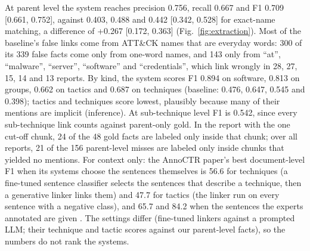 \documentclass[conference,letterpaper]{IEEEtran}
\begin{document}
At parent level the system reaches precision 0.756, recall 0.667 and F1 0.709 [0.661, 0.752], against 0.403, 0.488 and 0.442 [0.342, 0.528] for exact-name matching, a difference of +0.267 [0.172, 0.363] (Fig.~\ref{fig:extraction}). Most of the baseline's false links come from ATT\&CK names that are everyday words: 300 of its 339 false facts come only from one-word names, and 143 only from ``at'', ``malware'', ``server'', ``software'' and ``credentials'', which link wrongly in 28, 27, 15, 14 and 13 reports. By kind, the system scores F1 0.894 on software, 0.813 on groups, 0.662 on tactics and 0.687 on techniques (baseline: 0.476, 0.647, 0.545 and 0.398); tactics and techniques score lowest, plausibly because many of their mentions are implicit (inference). At sub-technique level F1 is 0.542, since every sub-technique link counts against parent-only gold. In the report with the one cut-off chunk, 24 of the 48 gold facts are labeled only inside that chunk; over all reports, 21 of the 156 parent-level misses are labeled only inside chunks that yielded no mentions. For context only: the AnnoCTR paper's best document-level F1 when its systems choose the sentences themselves is 56.6 for techniques (a fine-tuned sentence classifier selects the sentences that describe a technique, then a generative linker links them) and 47.7 for tactics (the linker run on every sentence with a negative class), and 65.7 and 84.2 when the sentences the experts annotated are given \cite[Table~9]{lange2024}. The settings differ (fine-tuned linkers against a prompted LLM; their technique and tactic scores against our parent-level facts), so the numbers do not rank the systems.
\end{document}
